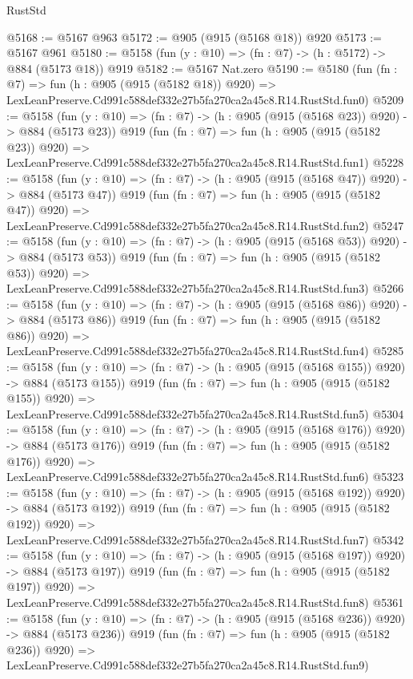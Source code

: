 \begin{lexlean}{RustStd}
\begin{coremodule}
@5168 := @5167 @963
@5172 := @905 (@915 (@5168 @18)) @920
@5173 := @5167 @961
@5180 := @5158 (fun (y : @10) => (fn : @7) -> (h : @5172) -> @884 (@5173 @18)) @919
@5182 := @5167 Nat.zero
@5190 := @5180
    (fun (fn : @7) =>
    fun (h : @905 (@915 (@5182 @18)) @920) =>
    LexLeanPreserve.Cd991c588def332e27b5fa270ca2a45c8.R14.RustStd.fun0)
@5209 := @5158
    (fun (y : @10) => (fn : @7) -> (h : @905 (@915 (@5168 @23)) @920) -> @884 (@5173 @23))
    @919
    (fun (fn : @7) =>
    fun (h : @905 (@915 (@5182 @23)) @920) =>
    LexLeanPreserve.Cd991c588def332e27b5fa270ca2a45c8.R14.RustStd.fun1)
@5228 := @5158
    (fun (y : @10) => (fn : @7) -> (h : @905 (@915 (@5168 @47)) @920) -> @884 (@5173 @47))
    @919
    (fun (fn : @7) =>
    fun (h : @905 (@915 (@5182 @47)) @920) =>
    LexLeanPreserve.Cd991c588def332e27b5fa270ca2a45c8.R14.RustStd.fun2)
@5247 := @5158
    (fun (y : @10) => (fn : @7) -> (h : @905 (@915 (@5168 @53)) @920) -> @884 (@5173 @53))
    @919
    (fun (fn : @7) =>
    fun (h : @905 (@915 (@5182 @53)) @920) =>
    LexLeanPreserve.Cd991c588def332e27b5fa270ca2a45c8.R14.RustStd.fun3)
@5266 := @5158
    (fun (y : @10) => (fn : @7) -> (h : @905 (@915 (@5168 @86)) @920) -> @884 (@5173 @86))
    @919
    (fun (fn : @7) =>
    fun (h : @905 (@915 (@5182 @86)) @920) =>
    LexLeanPreserve.Cd991c588def332e27b5fa270ca2a45c8.R14.RustStd.fun4)
@5285 := @5158
    (fun (y : @10) => (fn : @7) -> (h : @905 (@915 (@5168 @155)) @920) -> @884 (@5173 @155))
    @919
    (fun (fn : @7) =>
    fun (h : @905 (@915 (@5182 @155)) @920) =>
    LexLeanPreserve.Cd991c588def332e27b5fa270ca2a45c8.R14.RustStd.fun5)
@5304 := @5158
    (fun (y : @10) => (fn : @7) -> (h : @905 (@915 (@5168 @176)) @920) -> @884 (@5173 @176))
    @919
    (fun (fn : @7) =>
    fun (h : @905 (@915 (@5182 @176)) @920) =>
    LexLeanPreserve.Cd991c588def332e27b5fa270ca2a45c8.R14.RustStd.fun6)
@5323 := @5158
    (fun (y : @10) => (fn : @7) -> (h : @905 (@915 (@5168 @192)) @920) -> @884 (@5173 @192))
    @919
    (fun (fn : @7) =>
    fun (h : @905 (@915 (@5182 @192)) @920) =>
    LexLeanPreserve.Cd991c588def332e27b5fa270ca2a45c8.R14.RustStd.fun7)
@5342 := @5158
    (fun (y : @10) => (fn : @7) -> (h : @905 (@915 (@5168 @197)) @920) -> @884 (@5173 @197))
    @919
    (fun (fn : @7) =>
    fun (h : @905 (@915 (@5182 @197)) @920) =>
    LexLeanPreserve.Cd991c588def332e27b5fa270ca2a45c8.R14.RustStd.fun8)
@5361 := @5158
    (fun (y : @10) => (fn : @7) -> (h : @905 (@915 (@5168 @236)) @920) -> @884 (@5173 @236))
    @919
    (fun (fn : @7) =>
    fun (h : @905 (@915 (@5182 @236)) @920) =>
    LexLeanPreserve.Cd991c588def332e27b5fa270ca2a45c8.R14.RustStd.fun9)

\end{coremodule}
\end{lexlean}
